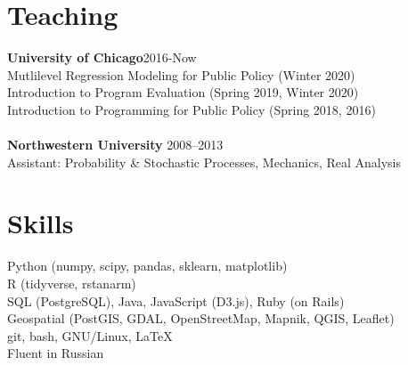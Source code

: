 \documentclass[margin,line]{resume}
\begin{document}
\begin{resume}
        \section{\mysidestyle Teaching}
        {\bf University of Chicago}\hfill{2016-Now}\\
        Mutlilevel Regression Modeling for Public Policy (Winter 2020)\\
        Introduction to Program Evaluation (Spring 2019, Winter 2020)\\Introduction to Programming for Public Policy (Spring 2018, 2016)\\\\
	{\bf Northwestern University} \hfill {2008--2013}\\
	Assistant: Probability \& Stochastic Processes, Mechanics, Real Analysis%
	




    \section{\mysidestyle Skills}
		Python (numpy, scipy, pandas, sklearn, matplotlib) \\
                R (tidyverse, rstanarm) \\
                SQL (PostgreSQL), Java, JavaScript (D3.js), Ruby (on Rails)\\
                Geospatial (PostGIS, GDAL, OpenStreetMap, Mapnik, QGIS, Leaflet)\\
                git, bash, GNU/Linux, \LaTeX\\
                Fluent in Russian

\end{resume}
\end{document}
